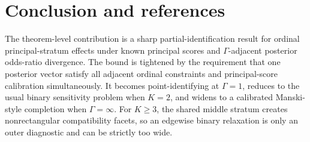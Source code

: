 \documentclass[11pt]{article}
\theoremstyle{definition}
\theoremstyle{plain}
\theoremstyle{remark}
\begin{document}
\section{Conclusion and references}
The theorem-level contribution is a sharp partial-identification result for
ordinal principal-stratum effects under known principal scores and
\(\Gamma\)-adjacent posterior odds-ratio divergence.  The bound is tightened by
the requirement that one posterior vector satisfy all adjacent ordinal
constraints and principal-score calibration simultaneously.  It becomes
point-identifying at \(\Gamma=1\), reduces to the usual binary sensitivity
problem when \(K=2\), and widens to a calibrated Manski-style completion when
\(\Gamma=\infty\).  For \(K\ge3\), the shared middle stratum creates
nonrectangular compatibility facets, so an edgewise binary relaxation is only
an outer diagnostic and can be strictly too wide.
\end{document}
